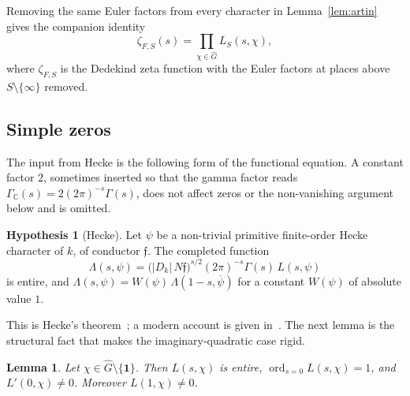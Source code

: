 \documentclass[11pt]{article}
\theoremstyle{plain}
\newtheorem{lemma}[theorem]{Lemma}
\theoremstyle{definition}
\newtheorem{hypothesis}[theorem]{Hypothesis}
\theoremstyle{remark}
\newcommand{\C}{\mathbb{C}}
\newcommand{\ord}{\operatorname{ord}}
\newcommand{\triv}{\mathbf{1}}
\begin{document}
Removing the same Euler factors from every character in Lemma~\ref{lem:artin} gives the companion identity
\begin{equation}
\label{eq:zetaS}
  \zeta_{F,S}(s)=\prod_{\chi\in\widehat G}L_S(s,\chi),
\end{equation}
where $\zeta_{F,S}$ is the Dedekind zeta function with the Euler factors at places above $S\setminus\{\infty\}$ removed.

\subsection{Simple zeros}

The input from Hecke is the following form of the functional equation.
A constant factor $2$, sometimes inserted so that the gamma factor reads $\Gamma_{\C}(s)=2(2\pi)^{-s}\Gamma(s)$, does not affect zeros or the non-vanishing argument below and is omitted.

\begin{hypothesis}[Hecke]
\label{hyp:hecke}
Let $\psi$ be a non-trivial primitive finite-order Hecke character of $k$, of conductor $\mathfrak{f}$.
The completed function
\[
  \Lambda(s,\psi)
  =\bigl(|D_k|\,N\mathfrak{f}\bigr)^{s/2}(2\pi)^{-s}\Gamma(s)\,L(s,\psi)
\]
is entire, and $\Lambda(s,\psi)=W(\psi)\,\Lambda(1-s,\overline{\psi})$ for a constant $W(\psi)$ of absolute value $1$.
\end{hypothesis}

This is Hecke's theorem~\cite{Hecke1918}; a modern account is given in~\cite[Chapter~VII]{Neukirch}.
The next lemma is the structural fact that makes the imaginary-quadratic case rigid.

\begin{lemma}
\label{lem:simple}
Let $\chi\in\widehat G\setminus\{\triv\}$.
Then $L(s,\chi)$ is entire, $\ord_{s=0}L(s,\chi)=1$, and $L'(0,\chi)\neq 0$.
Moreover $L(1,\chi)\neq 0$.
\end{lemma}
\end{document}
